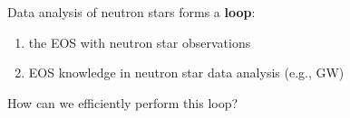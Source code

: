 \def\x{2mm}
\def\y{1mm}

Data analysis of neutron stars forms a \textbf{loop}:

\vspace{\y}
\begin{enumerate}
    \item {} the EOS with neutron star observations

    \vspace{\x}
    
    \item {} EOS knowledge in neutron star data analysis (e.g., GW)
\end{enumerate}

\vspace{\x}

How can we efficiently perform this loop?

\vspace{\y}

\centering
{}    